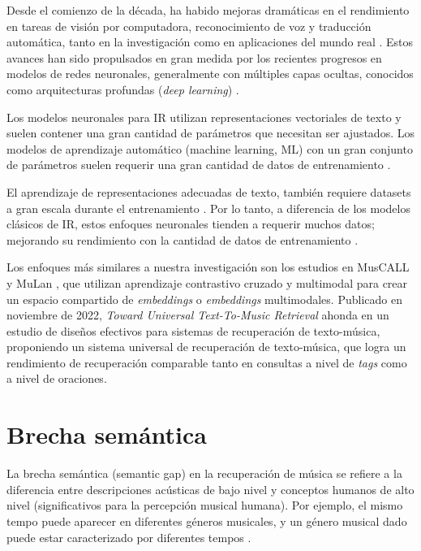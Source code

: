 Desde el comienzo de la década, ha habido mejoras dramáticas en el rendimiento en tareas de visión por computadora, reconocimiento de voz y traducción automática, tanto en la investigación como en aplicaciones del mundo real \cite{LeCun2015DeepL}. Estos avances han sido propulsados en gran medida por los recientes progresos en modelos de redes neuronales, generalmente con múltiples capas ocultas, conocidos como arquitecturas profundas (\textit{deep learning}) \cite{LeCun2015DeepL, Bahdanau2014NeuralMT, Deng2014DeepLM, Hinton2012DeepNN}. 

Los modelos neuronales para IR utilizan representaciones vectoriales de texto y suelen contener una gran cantidad de parámetros que necesitan ser ajustados. Los modelos de aprendizaje automático (machine learning, ML) con un gran conjunto de parámetros suelen requerir una gran cantidad de datos de entrenamiento \cite{Taylor2006OptimisationMF}.

El aprendizaje de representaciones adecuadas de texto, también requiere datasets a gran escala durante el entrenamiento \cite{Mitra2016LearningTM}. Por lo tanto, a diferencia de los modelos clásicos de IR, estos enfoques neuronales tienden a requerir muchos datos; mejorando su rendimiento con la cantidad de datos de entrenamiento \cite{Mitra2017NeuralMF}.

Los enfoques más similares a nuestra investigación son los estudios en MusCALL \cite{Manco2022ContrastiveAL} y MuLan \cite{Huang2022MuLanAJ}, que utilizan aprendizaje contrastivo cruzado y multimodal para crear un espacio compartido de \textit{embeddings} o \textit{embeddings} multimodales. Publicado en noviembre de 2022, \textit{Toward Universal Text-To-Music Retrieval} \cite{Doh2022TowardUT} ahonda en un estudio de diseños efectivos para sistemas de recuperación de texto-música, proponiendo un sistema universal de recuperación de texto-música, que logra un rendimiento de recuperación comparable tanto en consultas a nivel de \textit{tags} como a nivel de oraciones.

\section{Brecha semántica}
\label{sec:semantic-gap}

La brecha semántica (semantic gap) en la recuperación de música se refiere a la diferencia entre descripciones acústicas de bajo nivel y conceptos humanos de alto nivel (significativos para la percepción musical humana). Por ejemplo, el mismo tempo puede aparecer en diferentes géneros musicales, y un género musical dado puede estar caracterizado por diferentes tempos \cite{Su2022HighperformanceCM}.

